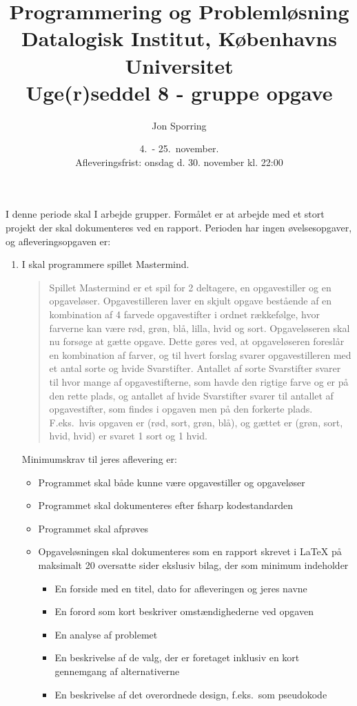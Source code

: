 \documentclass[a4paper,12pt]{article}
\title{Programmering og Problemløsning\\Datalogisk Institut,
  Københavns Universitet\\Uge(r)seddel 8 - gruppe opgave}
\author{Jon Sporring}
\date{4.\ - 25.\ november.\\Afleveringsfrist: onsdag d. 30. november kl. 22:00}
\begin{document}
\maketitle

I denne periode skal I arbejde grupper. Formålet er at arbejde med et stort projekt der skal dokumenteres ved en rapport. Perioden har ingen øvelsesopgaver, og afleveringsopgaven er:
\begin{enumerate}[label=8g.\arabic*,start=0]
\item I skal programmere spillet Mastermind. 
  \begin{quote}
    Spillet Mastermind er et spil for 2 deltagere, en opgavestiller og en opgaveløser. Opgavestilleren laver en skjult opgave bestående af en kombination af 4 farvede opgavestifter i ordnet rækkefølge, hvor farverne kan være rød, grøn, blå, lilla, hvid og sort. Opgaveløseren skal nu forsøge at gætte opgave. Dette gøres ved, at opgaveløseren foreslår en kombination af farver, og til hvert forslag svarer opgavestilleren med et antal sorte og hvide Svarstifter. Antallet af sorte Svarstifter svarer til hvor mange af opgavestifterne, som havde den rigtige farve og er på den rette plads, og antallet af hvide Svarstifter svarer til antallet af opgavestifter, som findes i opgaven men på den forkerte plads. F.eks.\ hvis opgaven er (rød, sort, grøn, blå), og gættet er (grøn, sort, hvid, hvid) er svaret 1 sort og 1 hvid.
  \end{quote}
  Minimumskrav til jeres aflevering er:
  \begin{itemize}
  \item Programmet skal både kunne være opgavestiller og opgaveløser
  \item Programmet skal dokumenteres efter fsharp kodestandarden
  \item Programmet skal afprøves
  \item Opgaveløsningen skal dokumenteres som en rapport skrevet i LaTeX på maksimalt 20 oversatte sider ekslusiv bilag, der som minimum indeholder
    \begin{itemize}
    \item En forside med en titel, dato for afleveringen og jeres navne
    \item En forord som kort beskriver omstændighederne ved opgaven
    \item En analyse af problemet
    \item En beskrivelse af de valg, der er foretaget inklusiv en kort gennemgang af alternativerne
    \item En beskrivelse af det overordnede design, f.eks.\ som pseudokode

\end{itemize}
\end{itemize}
\end{enumerate}
\end{document}
